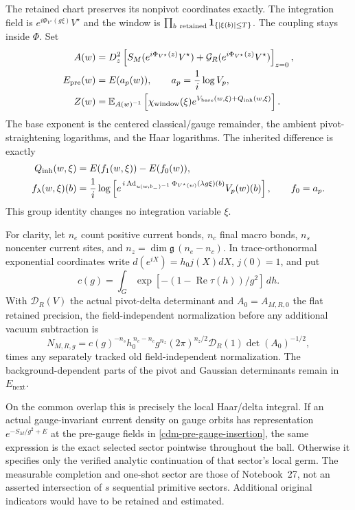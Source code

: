 The retained chart preserves its nonpivot coordinates exactly.
The integration field is $e^{i\Phi_{V^\star}(g\xi)}V^\star$ and
the window is
$\prod_{b\ {\rm retained}}\mathbf1_{\{|\xi(b)|\le T\}}$.
The coupling stays inside $\Phi$. Set
\begin{align}
 A(w)&=
 D_z^2\left[
 S_M(e^{i\Phi_{V^\star}(z)}V^\star)
 +\mathcal G_R(e^{i\Phi_{V^\star}(z)}V^\star)\right]_{z=0},
 \notag\\
 E_{\mathrm{pre}}(w)&=E(a_p(w)),\qquad a_p=\frac1i\log V_p,
 \notag\\
 Z(w)&=\mathbb E_{A(w)^{-1}}\left[
 \chi_{\mathrm{window}}(\xi)
 e^{V_{\mathrm{base}}(w,\xi)+Q_{\mathrm{inh}}(w,\xi)}
 \right].
 \label{cdm-integral-parts}
\end{align}
The base exponent is the centered classical/gauge remainder,
the ambient pivot-straightening logarithms, and the Haar
logarithms. The inherited difference is exactly
\begin{align}
 Q_{\mathrm{inh}}(w,\xi)&=E(f_1(w,\xi))-E(f_0(w)),\notag\\
 f_\lambda(w,\xi)(b)&=
 \frac1i\log\left[
 e^{\,i\operatorname{Ad}_{u(w;b_-)^{-1}}
                \Phi_{V^\star(w)}(\lambda g\xi)(b)}
 V_p(w)(b)\right],\qquad f_0=a_p.
 \label{cdm-pre-gauge-insertion}
\end{align}
This group identity changes no integration variable $\xi$.

For clarity, let $n_e$ count positive current bonds, $n_c$ final
macro bonds, $n_s$ noncenter current sites, and
$n_z=\dim\mathfrak g\,(n_e-n_c)$. In trace-orthonormal exponential
coordinates write $d(e^{iX})=h_0j(X)dX$, $j(0)=1$, and put
\[
 c(g)=\int_G
 \exp[-(1-\operatorname{Re}\tau(h))/g^2]\,dh.
\]
With $\mathcal D_R(V)$ the actual pivot-delta determinant and
$A_0=A_{M,R,0}$ the flat retained precision, the field-independent
normalization before any additional vacuum subtraction is
\begin{equation}
 N_{M,R,g}=
 c(g)^{-n_s}h_0^{\,n_e-n_c}g^{n_z}(2\pi)^{n_z/2}
       \mathcal D_R(1)\det(A_0)^{-1/2},
 \label{cdm-normalization}
\end{equation}
times any separately tracked old field-independent normalization.
The background-dependent parts of the pivot and Gaussian
determinants remain in $E_{\mathrm{next}}$.

On the common overlap this is precisely the local Haar/delta
integral. If an actual gauge-invariant current density on gauge
orbits has representation $e^{-S_M/g^2+E}$ at the pre-gauge
fields in \eqref{cdm-pre-gauge-insertion}, the same expression
is the exact selected sector pointwise throughout the ball.
Otherwise it specifies only the verified analytic continuation
of that sector's local germ. The measurable completion and
one-shot sector are those of Notebook~27, not an asserted
intersection of $s$ sequential primitive sectors. Additional
original indicators would have to be retained and estimated.

